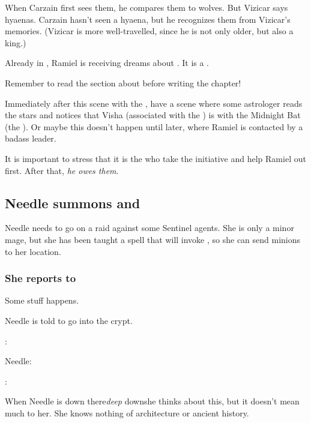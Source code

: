When Carzain first sees them, he compares them to wolves. But Vizicar says hyaenas. Carzain hasn't seen a hyaena, but he recognizes them from Vizicar's memories. (Vizicar is more well-travelled, since he is not only older, but also a king.)

Already in \TwilightAngelRememberEmph, Ramiel is receiving dreams about \vorcanths. 
It is a . 

Remember to read the section about  before writing the chapter!

Immediately after this scene with the \vorcanth{}, have a scene where some astrologer reads the stars and notices that Visha (associated with the ) is  with the Midnight Bat (the ). 
Or maybe this doesn't happen until later, where Ramiel is contacted by a badass \vorcanth{} leader. 

It is important to stress that it is the \vorcanths{} who take the initiative and help Ramiel out first. After that, \emph{he owes them}. 






\subsection{Needle summons \banes and \banerats}
Needle needs to go on a raid against some Sentinel agents. 
She is only a minor mage, but she has been taught a spell that will invoke \Achsah{}, so she can send minions to her location. 





\subsubsection{She reports to \Achsah}
Some stuff happens. 

Needle is told to go into the crypt. 

\Achsah: 

Needle: 

\Achsah: 

When Needle is down there\dash \emph{deep} down\dash she thinks about this, but it doesn't mean much to her. 
She knows nothing of architecture or ancient history. 





